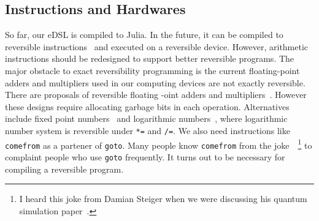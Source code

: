 \documentclass[aps,twocolumn,longbibliography,english,superscriptaddress]{revtex4-1}
\newcommand{\<}{\langle}
\renewcommand{\>}{\rangle}
\theoremstyle{definition}\newtheorem{definition}{\textit{Definition}}
\begin{document}
\subsection{Instructions and Hardwares}\label{sec:hardware}
So far, our eDSL is compiled to Julia.
In the future, it can be compiled to reversible instructions~\cite{Vieri1999} and executed on a reversible device.
However, arithmetic instructions should be redesigned to support better reversible programs.
The major obstacle to exact reversibility programming is the current floating-point adders and multipliers used in our computing devices are not exactly reversible.
There are proposals of reversible floating -oint adders and multipliers~\cite{Nachtigal2010,Nachtigal2011,Nguyen2013,Hner2018}. However these designs require allocating garbage bits in each operation.
Alternatives include fixed point numbers~\cite{FixedPointNumbers} and logarithmic numbers~\cite{Taylor1988,LogarithmicNumbers}, where logarithmic number system is reversible under \texttt{*=} and \texttt{/=}.
We also need instructions like \texttt{comefrom} as a partener of \texttt{goto}.
Many people know \texttt{comefrom} from the joke~\cite{COMEFROM}~\footnote{I heard this joke from Damian Steiger when we were discussing his quantum simulation paper~\cite{Haner2017}.} to complaint people who use \texttt{goto} frequently.
It turns out to be necessary for compiling a reversible program.
\end{document}
